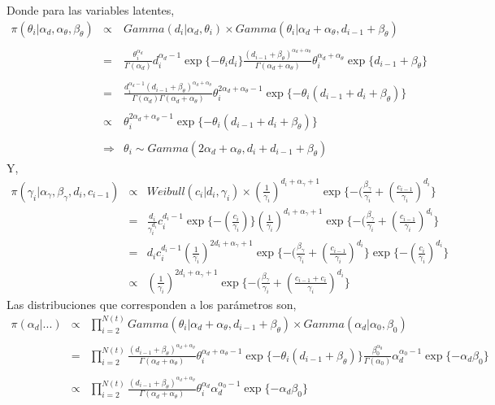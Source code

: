 Donde para las variables latentes,
\begin{eqnarray*}
\pi(\theta_i|\alpha_d,\alpha_\theta,\beta_\theta)&\propto& Gamma(d_i|\alpha_d,\theta_i)\times Gamma(\theta_i|\alpha_d+\alpha_\theta,d_{i-1}+\beta_\theta)\\
\\
&=&\frac{\theta_i^{\alpha_d}}{\Gamma(\alpha_d)} d_i^{\alpha_d-1} \exp{\{-\theta_id_i\}}\frac{(d_{i-1}+\beta_\theta)^{\alpha_d+\alpha_\theta}}{\Gamma(\alpha_d+\alpha_\theta)}\theta_i^{\alpha_d+\alpha_\theta}\exp{\{d_{i-1}+\beta_\theta\}}\\
\\
&=&\frac{d_i^{\alpha_d-1}(d_{i-1}+\beta_\theta)^{\alpha_d+\alpha_\theta}}{\Gamma(\alpha_d)\Gamma(\alpha_d+\alpha_\theta)} \theta_i^{2\alpha_d+\alpha_\theta-1}\exp{\{-\theta_i(d_{i-1}+d_i+\beta_\theta)\}}\\
\\
&\propto& \theta_i^{2\alpha_d+\alpha_\theta-1}\exp{\{-\theta_i(d_{i-1}+d_i+\beta_\theta)\}}\\
\\
&\Rightarrow& \theta_i \sim Gamma(2\alpha_d+\alpha_\theta,d_i+d_{i-1}+\beta_\theta)
\end{eqnarray*}
Y,
\begin{eqnarray*}
\pi(\gamma_i|\alpha_\gamma,\beta_\gamma,d_i,c_{i-1})&\propto& Weibull(c_i|d_i,\gamma_i)\times (\frac{1}{\gamma_i})^{d_i +\alpha_\gamma+1}\exp\{-(\frac{\beta_\gamma}{\gamma_i}+(\frac{c_{i-1}}{\gamma_i})^{d_i}\}\\
&=&\frac{d_i}{\gamma_i^{d_i}}c_i^{d_i-1}\exp{\{-(\frac{c_i}{\gamma_i})\}}(\frac{1}{\gamma_i})^{d_i+\alpha_\gamma+1}\exp\{-(\frac{\beta_\gamma}{\gamma_i}+(\frac{c_{i-1}}{\gamma_i})^{d_i}\}\\
&=&d_i c_i^{d_i-1}(\frac{1}{\gamma_i})^{2d_i+\alpha_\gamma+1}\exp\{-(\frac{\beta_\gamma}{\gamma_i}+(\frac{c_{i-1}}{\gamma_i})^{d_i}\}\exp{\{-(\frac{c_i}{\gamma_i})^{d_i}\}}\\
&\propto&(\frac{1}{\gamma_i})^{2d_i+\alpha_\gamma+1}\exp\{-(\frac{\beta_\gamma}{\gamma_i}+(\frac{c_{i-1}+c_i}{\gamma_i})^{d_i}\}
\end{eqnarray*}
Las distribuciones que corresponden a los par\'ametros son,
\begin{eqnarray*}
\pi(\alpha_d|...)&\propto& \prod_{i=2}^{N(t)} Gamma(\theta_i|\alpha_d+\alpha_\theta,d_{i-1}+\beta_\theta)\times Gamma(\alpha_d|\alpha_0,\beta_0)\\
\\
&=&\prod_{i=2}^{N(t)}\frac{(d_{i-1}+\beta_\theta)^{\alpha_d+\alpha_\theta}}{\Gamma(\alpha_d+\alpha_\theta)} \theta_i^{\alpha_d+\alpha_\theta-1} \exp{\{-\theta_i(d_{i-1}+\beta_\theta)\}}\frac{\beta_0^{\alpha_0}}{\Gamma(\alpha_0)} \alpha_d^{\alpha_0-1}\exp{\{-\alpha_d\beta_0\}}\\
\\
&\propto&\prod_{i=2}^{N(t)}\frac{(d_{i-1}+\beta_\theta)^{\alpha_d+\alpha_\theta}}{\Gamma(\alpha_d+\alpha_\theta)} \theta_i^{\alpha_d}\alpha_d^{\alpha_0-1}\exp{\{-\alpha_d\beta_0\}}
\end{eqnarray*}
